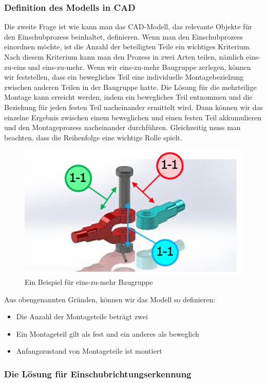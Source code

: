 \documentclass[14pt,a4paper,titlepage]{article}
\begin{document}
		\subsubsection{Definition des Modells in CAD}
		Die zweite Frage ist wie kann man das CAD-Modell, das relevante Objekte für den Einschubprozess beinhaltet, definieren. Wenn man den Einschubprozess einordnen möchte, ist die Anzahl der beteiligten Teile ein wichtiges Kriterium. Nach diesem Kriterium kann man den Prozess in zwei Arten teilen, nämlich eins-zu-eins und eins-zu-mehr.  
		\bigbreak
		Wenn wir eins-zu-mehr Baugruppe zerlegen, können wir feststellen, dass ein bewegliches Teil eine individuelle Montagebeziehung zwischen anderen Teilen in der Baugruppe hatte. Die Lösung für die mehrteilige Montage kann erreicht werden, indem ein bewegliches Teil entnommen und die Beziehung für jeden festen Teil nacheinander ermittelt wird. Dann können wir das einzelne Ergebnis zwischen einem beweglichen und einen festen Teil akkumulieren und den Montageprozess nacheinander durchführen. Gleichzeitig muss man beachten, dass die Reihenfolge eine wichtige Rolle spielt.\\
			\begin{figure}[h!]
			\centering
			\includegraphics[width=0.5\linewidth]{eins-zu-mehr.png}
			\caption{Ein Beispiel für eins-zu-mehr Baugruppe}
			\end{figure}
		Aus obengenannten Gründen, können wir das Modell so definieren:
			\begin{itemize}
				\item Die Anzahl der Montageteile beträgt zwei
				\item Ein Montageteil gilt als fest und ein anderes als beweglich
				\item Anfangszustand von Montageteile ist montiert
			\end{itemize}
		\subsubsection{Die Lösung für Einschubrichtungserkennung}
\end{document}
